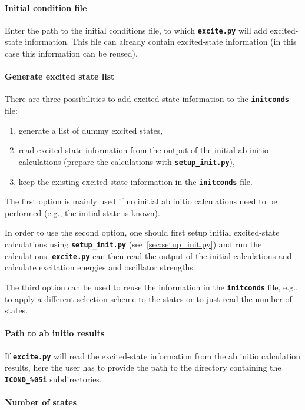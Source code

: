 \documentclass[a4paper,10pt,DIV=15,openany]{scrbook}
\newcommand{\ttt}[1]{\textbf{\texttt{#1}}}
\begin{document}
\paragraph{Initial condition file}

Enter the path to the initial conditions file, to which \ttt{excite.py} will add excited-state information. This file can already contain excited-state information (in this case this information can be reused).

\paragraph{Generate excited state list}

There are three possibilities to add excited-state information to the \ttt{initconds} file:
\begin{enumerate}
  \item generate a list of dummy excited states,
  \item read excited-state information from the output of the initial ab initio calculations (prepare the calculations with \ttt{setup\_init.py}),
  \item keep the existing excited-state information in the \ttt{initconds} file.
\end{enumerate}
The first option is mainly used if no initial ab initio calculations need to be performed (e.g., the initial state is known). 

In order to use the second option, one should first setup initial excited-state calculations using \ttt{setup\_init.py} (see~\ref{sec:setup_init.py}) and run the calculations. \ttt{excite.py} can then read the output of the initial calculations and calculate excitation energies and oscillator strengths.

The third option can be used to reuse the information in the \ttt{initconds} file, e.g., to apply a different selection scheme to the states or to just read the number of states.

\paragraph{Path to ab initio results}

If \ttt{excite.py} will read the excited-state information from the ab initio calculation results, here the user has to provide the path to the directory containing the \ttt{ICOND\_\%05i} subdirectories.

\paragraph{Number of states}
\end{document}
